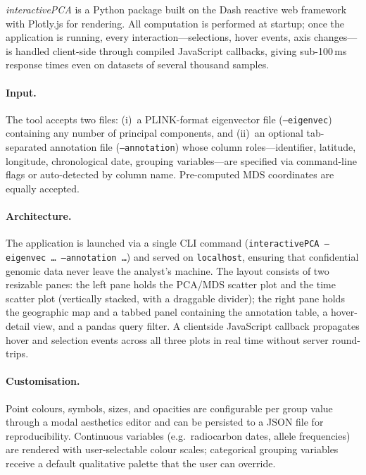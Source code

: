 \documentclass[unnumsec,webpdf,contemporary,large]{oup-authoring-template}
\begin{document}
\textit{interactivePCA} is a Python package built on the Dash reactive
web framework \citep{Dash2024} with Plotly.js for rendering.
All computation is performed at startup; once the application is
running, every interaction---selections, hover events, axis
changes---is handled client-side through compiled JavaScript callbacks,
giving sub-100\,ms response times even on datasets of several thousand
samples.

\paragraph{Input.}
The tool accepts two files: (i)~a PLINK-format eigenvector file
(\texttt{--eigenvec}) containing any number of principal components,
and (ii)~an optional tab-separated annotation file
(\texttt{--annotation}) whose column roles---identifier, latitude,
longitude, chronological date, grouping variables---are specified via
command-line flags or auto-detected by column name.
Pre-computed MDS coordinates are equally accepted.

\paragraph{Architecture.}
The application is launched via a single CLI command
(\texttt{interactivePCA --eigenvec \ldots{} --annotation \ldots{}})
and served on \texttt{localhost}, ensuring that confidential genomic
data never leave the analyst's machine.
The layout consists of two resizable panes: the left pane holds the
PCA/MDS scatter plot and the time scatter plot (vertically stacked,
with a draggable divider); the right pane holds the geographic map and
a tabbed panel containing the annotation table, a hover-detail view,
and a pandas query filter.
A clientside JavaScript callback propagates hover and selection events
across all three plots in real time without server round-trips.

\paragraph{Customisation.}
Point colours, symbols, sizes, and opacities are configurable per
group value through a modal aesthetics editor and can be persisted to a
JSON file for reproducibility.
Continuous variables (e.g.\ radiocarbon dates, allele frequencies) are
rendered with user-selectable colour scales; categorical grouping
variables receive a default qualitative palette that the user can
override.

\end{document}
